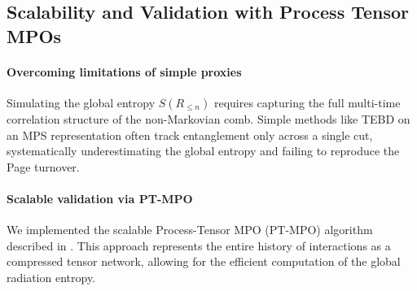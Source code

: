 \documentclass[a4paper,11pt]{article}
\newcommand{\HMC}{\textsc{HMC}\xspace}
\theoremstyle{plain}
\theoremstyle{definition}
\theoremstyle{remark}
\begin{document}
\begin{table}[htbp]
\centering
\caption{K-fold ($K=5$) cross-validation of the normalized RMSE to the ideal Page curve, showing stable performance across different subsets of random seeds.}
\label{tab:cv}
\vspace{0.5em}
\vspace{0.5em}
\end{table}

\begin{table}[htbp]
\centering
\caption{Repetition-code fidelity versus temporal noise correlation ($\rho$) and error rate ($p$). This diagnostic shows that positive temporal correlations degrade error correction, a key feature of non-Markovian channels like \HMC{}.}
\label{tab:qec}
\vspace{0.5em}
\resizebox{0.7\textwidth}{!}{\pgfplotstabletypeset{\datatableQEC}}
\vspace{0.5em}
\end{table}

\subsection{Scalability and Validation with Process Tensor MPOs}
\label{sec:mpo_mps_validation}
\paragraph{Overcoming limitations of simple proxies}
Simulating the global entropy $S(R_{\le n})$ requires capturing the full multi-time correlation structure of the non-Markovian comb. Simple methods like TEBD on an MPS representation often track entanglement only across a single cut, systematically underestimating the global entropy and failing to reproduce the Page turnover.

\paragraph{Scalable validation via PT-MPO}
We implemented the scalable Process-Tensor MPO (PT-MPO) algorithm described in . This approach represents the entire history of interactions as a compressed tensor network, allowing for the efficient computation of the global radiation entropy.
\end{document}
